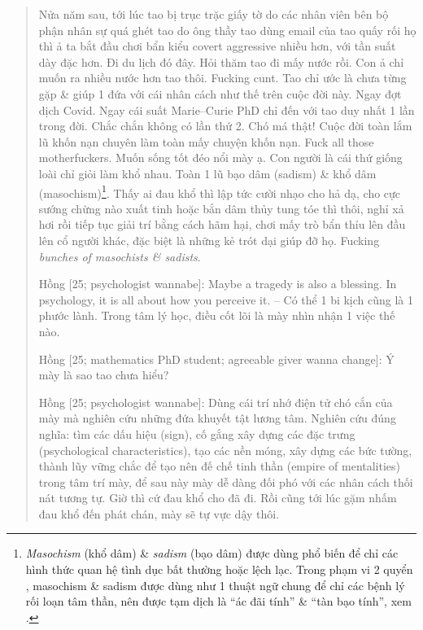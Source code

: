 \documentclass[12pt,twoside]{book}
\begin{document}
\begin{quote}
	Nửa năm sau, tới lúc tao bị trục trặc giấy tờ do các nhân viên bên bộ phận nhân sự quá ghét tao do ông thầy tao dùng email của tao quấy rối họ thì ả ta bắt đầu chơi bẩn kiểu covert aggressive nhiều hơn, với tần suất dày đặc hơn. Đi du lịch đó đây. Hỏi thăm tao đi mấy nước rồi. Con ả chỉ muốn ra nhiều nước hơn tao thôi. Fucking cunt. Tao chỉ ước là chưa từng gặp \& giúp 1 đứa với cái nhân cách như thế trên cuộc đời này. Ngay đợt dịch Covid. Ngay cái suất Marie--Curie PhD chỉ đến với tao duy nhất 1 lần trong đời. Chắc chắn không có lần thứ 2. Chó má thật! Cuộc đời toàn lắm lũ khốn nạn chuyên làm toàn mấy chuyện khốn nạn. Fuck all those motherfuckers. Muốn sống tốt đéo nổi mày ạ. Con người là cái thứ giống loài chỉ giỏi làm khổ nhau. Toàn 1 lũ bạo dâm (sadism) \& khổ dâm (masochism)\footnote{{\it Masochism} (khổ dâm) \& {\it sadism} (bạo dâm) được dùng phổ biến để chỉ các hình thức quan hệ tình dục bất thường hoặc lệch lạc. Trong phạm vi 2 quyển \cite{Peck_road,Peck_road_VN}, masochism \& sadism được dùng như 1 thuật ngữ chung để chỉ các bệnh lý rối loạn tâm thần, nên được tạm dịch là ``ác đãi tính'' \& ``tàn bạo tính'', xem \cite[Chú thích, p. 121]{Peck_road_VN}.}. Thấy ai đau khổ thì lập tức cười nhạo cho hả dạ, cho cực sướng chừng nào xuất tinh hoặc bắn dâm thủy tung tóe thì thôi, nghỉ xả hơi rồi tiếp tục giải trí bằng cách hãm hại, chơi mấy trò bẩn thỉu lên đầu lên cổ người khác, đặc biệt là những kẻ trót dại giúp đỡ họ. Fucking {\it bunches of masochists \& sadists}.
	
	{\sf Hồng [25; psychologist wannabe]}: Maybe a tragedy is also a blessing. In psychology, it is all about how you perceive it. -- Có thể 1 bi kịch cũng là 1 phước lành. Trong tâm lý học, điều cốt lõi là mày nhìn nhận 1 việc thế nào.
	
	{\sf Hồng [25; mathematics PhD student; agreeable giver wanna change]}: Ý mày là sao tao chưa hiểu?
	
	{\sf Hồng [25; psychologist wannabe]}: Dùng cái trí nhớ điện tử chó cắn của mày mà nghiên cứu những đứa khuyết tật lương tâm. Nghiên cứu đúng nghĩa: tìm các dấu hiệu (sign), cố gắng xây dựng các đặc trưng (psychological characteristics), tạo các nền móng, xây dựng các bức tường, thành lũy vững chắc để tạo nên đế chế tinh thần (empire of mentalities) trong tâm trí mày, để sau này mày dễ dàng đối phó với các nhân cách thối nát tương tự. Giờ thì cứ đau khổ cho đã đi. Rồi cũng tới lúc gặm nhấm đau khổ đến phát chán, mày sẽ tự vực dậy thôi.
\end{quote}
\end{document}
